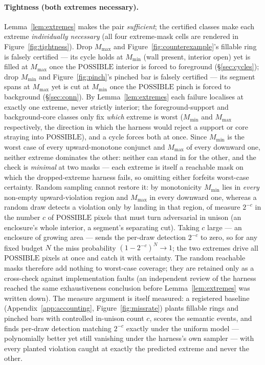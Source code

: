 \documentclass[10pt]{article}
\newcommand{\POSS}{\mathrm{POSSIBLE}}
\begin{document}
\paragraph{Tightness (both extremes necessary).}
Lemma~\ref{lem:extremes} makes the pair \emph{sufficient}; the certified
classes make each extreme \emph{individually necessary} (all four
extreme-mask cells are rendered in Figure~\ref{fig:tightness}). Drop $M_{\max}$
and Figure~\ref{fig:counterexample}'s fillable ring is falsely certified
--- its cycle holds at $M_{\min}$ (wall present, interior open) yet is
filled at $M_{\max}$ once the $\POSS$ interior is forced to foreground
(\S\ref{sec:cycles}); drop $M_{\min}$ and Figure~\ref{fig:pinch}'s pinched
bar is falsely certified --- its segment spans at $M_{\max}$ yet is cut at
$M_{\min}$ once the $\POSS$ pinch is forced to background
(\S\ref{sec:conn}). By Lemma~\ref{lem:extremes} each failure localises at
exactly one extreme, never strictly interior; the foreground-support and
background-core classes only fix \emph{which} extreme is worst ($M_{\min}$
and $M_{\max}$ respectively, the direction in which the harness would
reject a support or core straying into $\POSS$), and a cycle forces both
at once. Since $M_{\min}$ is the worst case of every upward-monotone
conjunct and $M_{\max}$ of every downward one, neither extreme dominates
the other: neither can stand in for the other, and the check is \emph{minimal} at two
masks --- each extreme is itself a reachable mask on which the
dropped-extreme harness fails, so omitting either forfeits worst-case
certainty. Random sampling cannot restore it: by monotonicity $M_{\min}$
lies in \emph{every} non-empty upward-violation region and $M_{\max}$ in
every downward one, whereas a random draw detects a violation only by
landing in that region, of measure $2^{-c}$ in the number $c$ of $\POSS$
pixels that must turn adversarial in unison (an enclosure's whole
interior, a segment's separating cut). Taking $c$ large --- an enclosure
of growing area --- sends the per-draw detection $2^{-c}$ to zero, so for
any fixed budget $N$ the miss probability $(1-2^{-c})^{N}\to 1$; the two
extremes drive all $\POSS$ pixels at once and catch it with certainty. The
random reachable masks therefore add nothing to worst-case coverage; they
are retained only as a cross-check against implementation faults (an
independent review of the harness reached the same exhaustiveness
conclusion before Lemma~\ref{lem:extremes} was written down). The measure
argument is itself measured: a registered baseline
(Appendix~\ref{app:accounting}, Figure~\ref{fig:missrate}) plants fillable
rings and pinched bars with controlled in-unison count $c$, scores the
semantic events, and finds per-draw detection matching $2^{-c}$ exactly
under the uniform model --- polynomially better yet still vanishing under
the harness's own sampler --- with every planted violation caught at
exactly the predicted extreme and never the other.
\end{document}
